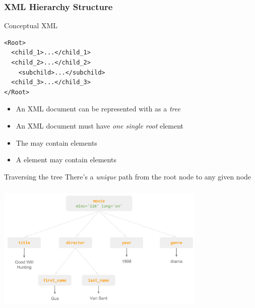 \documentclass[svgnames]{beamer}
\begin{document}
\begin{frame}[fragile]
\frametitle{XML Hierarchy Structure}

\begin{block}{Conceptual XML}
\scriptsize
\begin{verbatim}
<Root>
  <child_1>...</child_1>
  <child_2>...</child_2>
    <subchild>...</subchild>
  <child_3>...</child_3>
</Root>
\end{verbatim}
\end{block}

\begin{itemize}
 \item An XML document can be represented with as a \emph{tree}
 \item An XML document must have \emph{one single root} element
 \item The  may contain  elements
 \item A  element may contain  elements
\end{itemize}

\begin{block}{Traversing the tree}
There's a \emph{unique} path from the root node to any given node 
\end{block}

\end{frame}


\begin{frame}
\frametitle{}
\begin{center}
\includegraphics[width=10cm]{xml_movie_tree1.pdf}
\end{center}
\end{frame}

\end{document}
